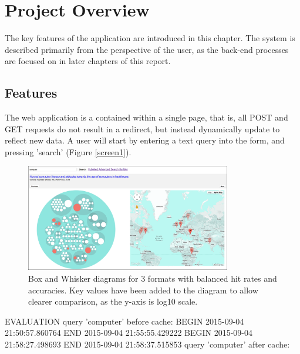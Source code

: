 \chapter{Project Overview}
The key features of the application are introduced in this chapter. The system is described primarily from the perspective of the user, as the back-end processes are focused on in later chapters of this report. 

\section{Features}
The web application is a contained within a single page, that is, all POST and GET requests do not result in a redirect, but instead dynamically update to reflect new data. A user will start by entering a text query into the form, and pressing 'search' (Figure \ref{screen1}). 

\begin{figure}[!ht]
\begin{center}
	\includegraphics[width=0.8\textwidth]{../lib/images/screen1}
	\caption{Box and Whisker diagrams for 3 formats with balanced hit rates and accuracies. Key values have been added to the diagram to allow clearer comparison, as the y-axis is log10 scale.\label{fig:geoboxes}}
\end{center}
\end{figure}


EVALUATION
query 'computer' before cache: 
BEGIN 2015-09-04 21:50:57.860764
END 2015-09-04 21:55:55.429222
BEGIN 2015-09-04 21:58:27.498693
END 2015-09-04 21:58:37.515853
query 'computer' after cache: 